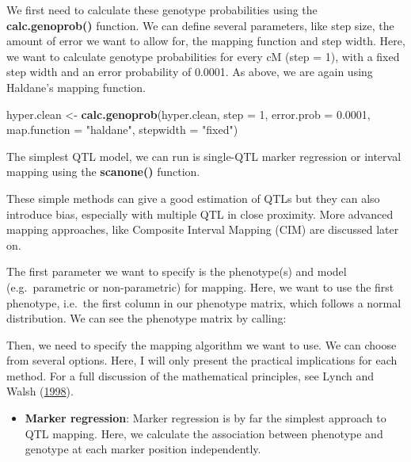 \documentclass[12pt,]{book}
\newenvironment{Shaded}{\begin{snugshade}}{\end{snugshade}}
\newcommand{\KeywordTok}[1]{\textcolor[rgb]{0.13,0.29,0.53}{\textbf{{#1}}}}
\newcommand{\DataTypeTok}[1]{\textcolor[rgb]{0.13,0.29,0.53}{{#1}}}
\newcommand{\DecValTok}[1]{\textcolor[rgb]{0.00,0.00,0.81}{{#1}}}
\newcommand{\FloatTok}[1]{\textcolor[rgb]{0.00,0.00,0.81}{{#1}}}
\newcommand{\StringTok}[1]{\textcolor[rgb]{0.31,0.60,0.02}{{#1}}}
\newcommand{\NormalTok}[1]{{#1}}
\providecommand{\tightlist}{%
  \setlength{\itemsep}{0pt}\setlength{\parskip}{0pt}}
\theoremstyle{definition}
\theoremstyle{definition}
\theoremstyle{remark}
\begin{document}
We first need to calculate these genotype probabilities using the
\textbf{calc.genoprob()} function. We can define several parameters,
like step size, the amount of error we want to allow for, the mapping
function and step width. Here, we want to calculate genotype
probabilities for every cM (step = 1), with a fixed step width and an
error probability of 0.0001. As above, we are again using Haldane's
mapping function.

\begin{Shaded}
\begin{Highlighting}[]
\NormalTok{hyper.clean <-}\StringTok{ }\KeywordTok{calc.genoprob}\NormalTok{(hyper.clean, }\DataTypeTok{step =} \DecValTok{1}\NormalTok{, }\DataTypeTok{error.prob =} \FloatTok{0.0001}\NormalTok{, }
			\DataTypeTok{map.function =} \StringTok{"haldane"}\NormalTok{, }\DataTypeTok{stepwidth =} \StringTok{"fixed"}\NormalTok{)}
\end{Highlighting}
\end{Shaded}

The simplest QTL model, we can run is single-QTL marker regression or
interval mapping using the \textbf{scanone()} function.

These simple methods can give a good estimation of QTLs but they can
also introduce bias, especially with multiple QTL in close proximity.
More advanced mapping approaches, like Composite Interval Mapping (CIM)
are discussed later on.

The first parameter we want to specify is the phenotype(s) and model
(e.g.~parametric or non-parametric) for mapping. Here, we want to use
the first phenotype, i.e.~the first column in our phenotype matrix,
which follows a normal distribution. We can see the phenotype matrix by
calling:

\begin{Shaded}
\end{Shaded}

Then, we need to specify the mapping algorithm we want to use. We can
choose from several options. Here, I will only present the practical
implications for each method. For a full discussion of the mathematical
principles, see Lynch and Walsh
(\protect\hyperlink{ref-lynch1998genetics}{1998}).

\begin{itemize}
\tightlist
\item
  \textbf{Marker regression}: Marker regression is by far the simplest
  approach to QTL mapping. Here, we calculate the association between
  phenotype and genotype at each marker position independently.
\end{itemize}
\end{document}
